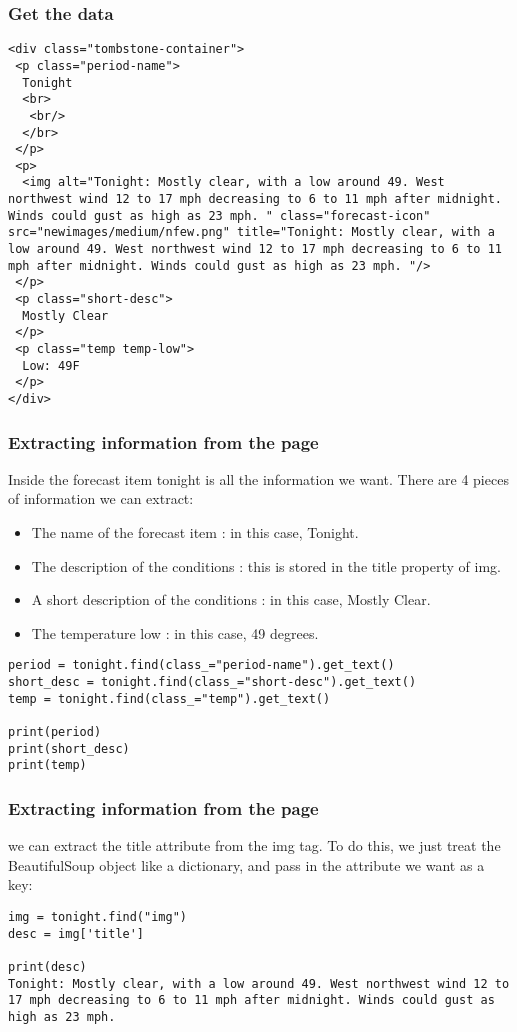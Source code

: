\begin{frame}[fragile]\frametitle{Get the data}

            \begin{lstlisting}
<div class="tombstone-container">
 <p class="period-name">
  Tonight
  <br>
   <br/>
  </br>
 </p>
 <p>
  <img alt="Tonight: Mostly clear, with a low around 49. West northwest wind 12 to 17 mph decreasing to 6 to 11 mph after midnight. Winds could gust as high as 23 mph. " class="forecast-icon" src="newimages/medium/nfew.png" title="Tonight: Mostly clear, with a low around 49. West northwest wind 12 to 17 mph decreasing to 6 to 11 mph after midnight. Winds could gust as high as 23 mph. "/>
 </p>
 <p class="short-desc">
  Mostly Clear
 </p>
 <p class="temp temp-low">
  Low: 49F
 </p>
</div>
\end{lstlisting}
\end{frame}

\begin{frame}[fragile]\frametitle{Extracting information from the page}
Inside the forecast item tonight is all the information we want. There are 4 pieces of information we can extract:
     \begin{itemize}
    \item     The name of the forecast item : in this case, Tonight.
    \item         The description of the conditions : this is stored in the title property of img.
    \item         A short description of the conditions : in this case, Mostly Clear.
    \item         The temperature low : in this case, 49 degrees.

	    \end{itemize}
	                \begin{lstlisting}
period = tonight.find(class_="period-name").get_text()
short_desc = tonight.find(class_="short-desc").get_text()
temp = tonight.find(class_="temp").get_text()

print(period)
print(short_desc)
print(temp)
\end{lstlisting}
\end{frame}


\begin{frame}[fragile]\frametitle{Extracting information from the page}
we can extract the title attribute from the img tag. To do this, we just treat the BeautifulSoup object like a dictionary, and pass in the attribute we want as a key:
	                \begin{lstlisting}
img = tonight.find("img")
desc = img['title']

print(desc)
Tonight: Mostly clear, with a low around 49. West northwest wind 12 to 17 mph decreasing to 6 to 11 mph after midnight. Winds could gust as high as 23 mph.
\end{lstlisting}
\end{frame}

